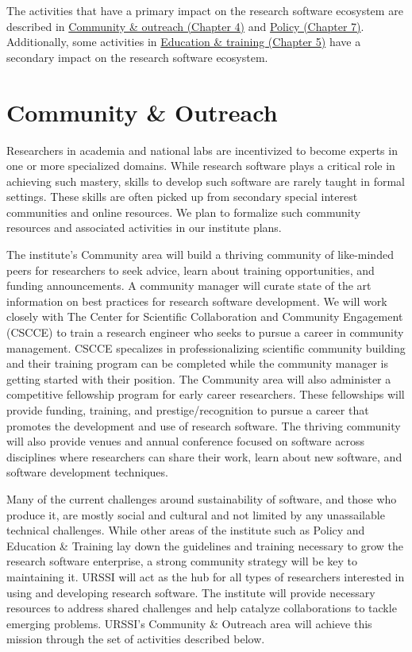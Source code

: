 \documentclass[
]{book}
\begin{document}
The activities that have a primary impact on the research software ecosystem are described in
\href{Ch-Comm}{Community \& outreach (Chapter 4)} and
\href{Ch-Policy}{Policy (Chapter 7)}.
Additionally, some activities in
\href{Ch-Edu}{Education \& training (Chapter 5)}
have a secondary impact
on the research software ecosystem.

\hypertarget{Ch-Comm}{%
\chapter{Community \& Outreach}\label{Ch-Comm}}

Researchers in academia and national labs are incentivized to become experts in one or more specialized domains.
While research software plays a critical role in achieving such mastery, skills to develop such software are rarely taught in formal settings.
These skills are often picked up from secondary special interest communities and online resources.
We plan to formalize such community resources and associated activities in our institute plans.

The institute's Community area will build a thriving community of like-minded peers for researchers to seek advice, learn about training opportunities, and funding announcements.
A community manager will curate state of the art information on best practices for research software development. We will work closely with The Center for Scientific Collaboration and Community Engagement (CSCCE) to train a research engineer who seeks to pursue a career in community management. CSCCE specalizes in professionalizing scientific community building and their training program can be completed while the community manager is getting started with their position.
The Community area will also administer a competitive fellowship program for early career researchers.
These fellowships will provide funding, training, and prestige/recognition to pursue a career that promotes the development and use of research software.
The thriving community will also provide venues and annual conference focused on software across disciplines where researchers can share their work, learn about new software, and software development techniques.

Many of the current challenges around sustainability of software, and those who produce it, are mostly social and cultural and not limited by any unassailable technical challenges.
While other areas of the institute such as Policy and Education \& Training lay down the guidelines and training necessary to grow the research software enterprise, a strong community strategy will be key to maintaining it.
URSSI will act as the hub for all types of researchers interested in using and developing research software.
The institute will provide necessary resources to address shared challenges and help catalyze collaborations to tackle emerging problems.
URSSI's Community \& Outreach area will achieve this mission through the set of activities described below.
\end{document}
